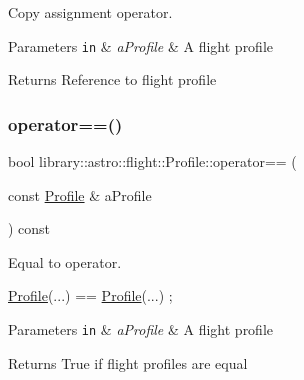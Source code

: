 Copy assignment operator. 


\begin{DoxyParams}[1]{Parameters}
\mbox{\tt in}  & {\em a\+Profile} & A flight profile \\
\hline
\end{DoxyParams}
\begin{DoxyReturn}{Returns}
Reference to flight profile 
\end{DoxyReturn}
\mbox{\label{classlibrary_1_1astro_1_1flight_1_1_profile_a02ca3f2ff4cf5b5cb093b15c4ed8fb33}} 
\subsubsection{\texorpdfstring{operator==()}{operator==()}}
{\footnotesize\ttfamily bool library\+::astro\+::flight\+::\+Profile\+::operator== (\begin{DoxyParamCaption}\item[{const \hyperlink{classlibrary_1_1astro_1_1flight_1_1_profile}{Profile} \&}]{a\+Profile }\end{DoxyParamCaption}) const}



Equal to operator. 


\begin{DoxyCode}
\hyperlink{classlibrary_1_1astro_1_1flight_1_1_profile_a34d66fdddf3eda9a3fed036d6b9a4363}{Profile}(...) == \hyperlink{classlibrary_1_1astro_1_1flight_1_1_profile_a34d66fdddf3eda9a3fed036d6b9a4363}{Profile}(...) ;
\end{DoxyCode}



\begin{DoxyParams}[1]{Parameters}
\mbox{\tt in}  & {\em a\+Profile} & A flight profile \\
\hline
\end{DoxyParams}
\begin{DoxyReturn}{Returns}
True if flight profiles are equal 
\end{DoxyReturn}
\mbox{\label{classlibrary_1_1astro_1_1flight_1_1_profile_a8fadb2b70ff950b2a1f1c0996ced7ad2}} 

